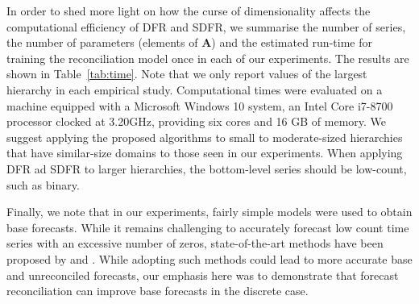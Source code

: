 \documentclass[a4paper,review,11pt,authoryear]{elsarticle}
\theoremstyle{definition}
\begin{document}
    
     In order to shed more light on how the curse of dimensionality affects the computational efficiency of DFR and SDFR, we summarise the number of series, the number of parameters (elements of $\mathbf{A}$) and the estimated run-time for training the reconciliation model once in each of our experiments. 
     The results are shown in Table~\ref{tab:time}. 
     Note that we only report values of the largest hierarchy in each empirical study. 
     Computational times were evaluated on a machine equipped with a Microsoft Windows 10 system, an Intel Core i7-8700 processor clocked at 3.20GHz, providing six cores and 16 GB of memory. We suggest applying the proposed algorithms to small to moderate-sized hierarchies that have similar-size domains to those seen in our experiments. When applying DFR ad SDFR to larger hierarchies, the bottom-level series should be low-count, such as binary. 

     \begin{table}
       \centering
       \caption{\label{tab:time} Reconciliation model size and computational time (in seconds) in the four experiments implemented in different sections.}
     \end{table}

     Finally, we note that in our experiments, fairly simple models were used to obtain base forecasts. While it remains challenging to accurately forecast low count time series with an excessive number of zeros, state-of-the-art methods have been proposed by \cite{berryBayesianForecastingMany2020a} and \cite{weissEfficientAccountingEstimation2022}. While adopting such methods could lead to more accurate base and unreconciled forecasts, our emphasis here was to demonstrate that forecast reconciliation can improve base forecasts in the discrete case.
\end{document}
